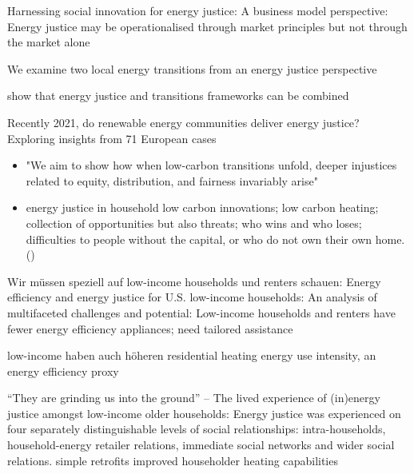 Harnessing social innovation for energy justice: A business model perspective: Energy justice may be operationalised through market principles but not through the market alone \cite{hiteva2017harnessing}

We examine two local energy transitions from an energy justice perspective \cite{mundaca2018successful}

show that energy justice and transitions frameworks can be combined \cite{jenkins2018humanizing}

Recently 2021, do renewable energy communities deliver energy justice? Exploring insights from 71 European cases \cite{hanke2021renewable}

\begin{itemize}
	\item "We aim to show how when low-carbon transitions unfold, deeper injustices related to equity, distribution, and fairness invariably arise" \cite{sovacool2019decarbonization}
	\item energy justice in household low carbon innovations; low carbon heating; collection of opportunities but also threats; who wins and who loses; difficulties to people without the capital, or who do not own their own home. (\cite{sovacool2019temporality})
\end{itemize}

Wir müssen speziell auf low-income households und renters schauen: Energy efficiency and energy justice for U.S. low-income households: An analysis of multifaceted challenges and potential: Low-income households and renters have fewer energy efficiency appliances; need tailored assistance \cite{xu2019energy}

low-income haben auch höheren residential heating energy use intensity, an energy efficiency proxy \cite{reames2016targeting}

“They are grinding us into the ground” – The lived experience of (in)energy justice amongst low-income older households: Energy justice was experienced on four separately distinguishable levels of social relationships: intra-households, household-energy retailer relations, immediate social networks and wider social relations. simple retrofits improved householder heating capabilities \cite{willand2018they}



